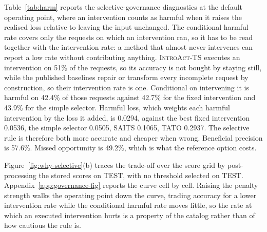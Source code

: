 \documentclass{article}
\newcommand{\introact}{\textsc{IntroAct-TS}}
\begin{document}
Table~\ref{tab:harm} reports the selective-governance diagnostics at the default operating
point, where an intervention counts as harmful when it raises the realised loss relative to
leaving the input unchanged. The conditional harmful rate covers only the requests on which an
intervention ran, so it has to be read together with the intervention rate: a method that
almost never intervenes can report a low rate without contributing anything. \introact{} executes an intervention on 51\% of the requests, so its accuracy is not bought by staying still, while the published baselines repair or transform every incomplete request by construction, so their intervention rate is one. Conditional on intervening it is harmful on 42.4\% of those requests against 42.7\% for the fixed intervention and 43.9\% for the simple selector. Harmful loss, which weights each harmful intervention by the loss it added, is 0.0294, against the best fixed intervention 0.0536, the simple selector 0.0505, SAITS 0.1065, TATO 0.2937. The selective rule is therefore both more accurate and cheaper when wrong.
Beneficial precision is 57.6\%. Missed opportunity is 49.2\%, which is what the reference option costs.

Figure~\ref{fig:why-selective}(b) traces the trade-off over the score grid by post-processing
the stored scores on TEST, with no threshold selected on TEST.
Appendix~\ref{app:governance-fig} reports the curve cell by cell. Raising the penalty strength walks the operating point down the curve, trading accuracy for a lower intervention rate while the conditional harmful rate moves little, so the rate at which an executed intervention hurts is a property of the catalog rather than of how cautious the rule is.
\end{document}

